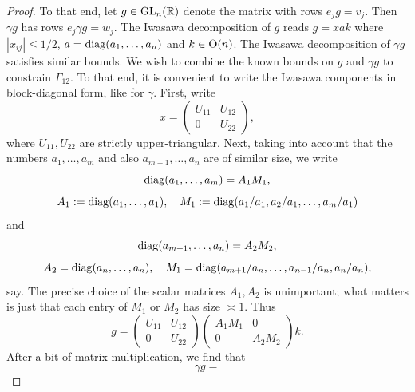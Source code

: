 \documentclass[reqno]{amsart} 
\begin{document}
\begin{proof}
  To that end, let $g \in \operatorname{GL}_n(\mathbb{R})$ denote the matrix with rows $e_j g = v_j$.  Then $\gamma g$ has rows $e_j \gamma g = w_j$.  The Iwasawa decomposition of $g$ reads $g = x a k$ where $|x_{i j}| \leq 1/2$, $a = \operatorname{diag}(a_1,\dotsc,a_n)$ and $k \in \operatorname{O}(n)$.  The Iwasawa decomposition of $\gamma g$ satisfies similar bounds.  We wish to combine the known bounds on $g$ and $\gamma g$ to constrain $\Gamma_{12}$.  To that end, it is convenient to write the Iwasawa components in block-diagonal form, like for $\gamma$.  First, write
  \begin{equation*}
    x = 
    \begin{pmatrix}
      U_{ 1 1}  &  U_{1 2} \\
      0 & U_{2 2}
    \end{pmatrix}
    ,
  \end{equation*}
  where $U_{1 1}, U_{2 2}$ are strictly upper-triangular.  Next, taking into account that the numbers $a_1,\dotsc,a_m$ and also $a_{m+1},\dotsc,a_n$ are of similar size, we write
  \begin{equation*}
    \operatorname{diag}(a_1,\dotsc,a_m) = A_1 M_1,
  \end{equation*}
  \begin{equation*}
    A_1 := \operatorname{diag}(a_1,\dotsc,a_1), \quad M_1 := \operatorname{diag}(a_1/a_1,a_2/a_1,\dotsc,a_m/a_1)
  \end{equation*}
  and
  \begin{equation*}
    \operatorname{diag}(a_{m+1},\dotsc,a_n) = A_2 M_2,
  \end{equation*}
  \begin{equation*}
    A_2 = \operatorname{diag}(a_{n},\dotsc,a_n), \quad M_1 = \operatorname{diag}(a_{m+1}/a_n,\dotsc,a_{n-1}/a_n,a_n/a_n),
  \end{equation*}
  say.  The precise choice of the scalar matrices $A_1,A_2$ is unimportant; what matters is just that each entry of $M_1$ or $M_2$ has size $\asymp 1$.  Thus
  \begin{equation*}
    g = 
    \begin{pmatrix}
      U_{11} & U_{1 2} \\
      0 & U_{2 2}
    \end{pmatrix}
    \begin{pmatrix}
      A_1 M_1 & 0 \\
      0 & A_2 M_2
    \end{pmatrix}
    k.
  \end{equation*}
  After a bit of matrix multiplication, we find that
  \begin{equation*}
    \gamma g =

\end{equation*}
\end{proof}
\end{document}
